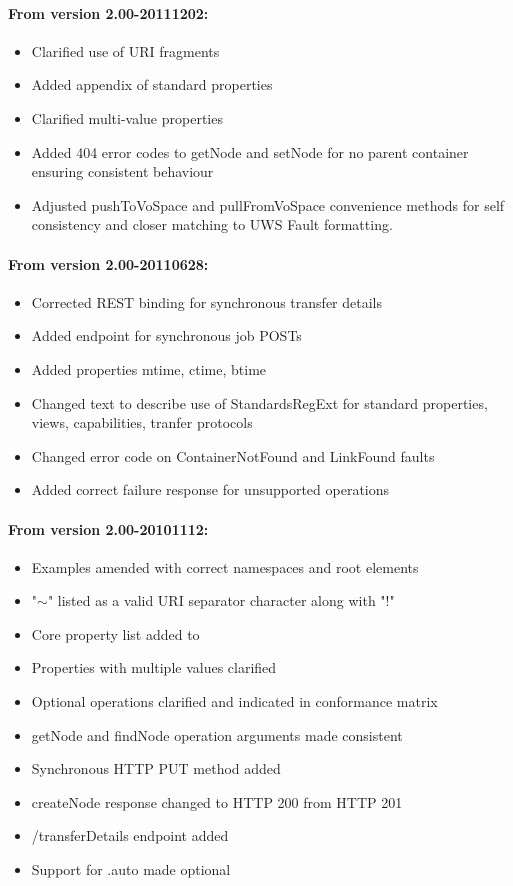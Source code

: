\documentclass[11pt,a4paper]{ivoa}
\begin{document}
\begin{appendices}
\paragraph{From version 2.00-20111202:}
\begin{itemize}
    \item Clarified use of URI fragments
    \item Added appendix of standard properties
    \item Clarified multi-value properties
    \item Added 404 error codes to getNode and setNode for no parent container ensuring consistent behaviour
    \item Adjusted pushToVoSpace and pullFromVoSpace convenience methods for self consistency and closer matching to UWS Fault formatting.
\end{itemize}

\paragraph{From version 2.00-20110628:}
\begin{itemize}
    \item Corrected REST binding for synchronous transfer details
    \item Added endpoint for synchronous job POSTs
    \item Added properties mtime, ctime, btime
    \item Changed text to describe use of StandardsRegExt for standard properties, views, capabilities, tranfer protocols
    \item Changed error code on ContainerNotFound and LinkFound faults
    \item Added correct failure response for unsupported operations
\end{itemize}

\paragraph{From version 2.00-20101112:}
\begin{itemize}
    \item Examples amended with correct namespaces and root elements
    \item "$\mathtt{\sim}$" listed as a valid URI separator character along with "!"
    \item Core property list added to
    \item Properties with multiple values clarified
    \item Optional operations clarified and indicated in conformance matrix
    \item getNode and findNode operation arguments made consistent
    \item Synchronous HTTP PUT method added
    \item createNode response changed to HTTP 200 from HTTP 201
    \item /{transferDetails} endpoint added
    \item Support for .auto made optional
\end{itemize}


\end{appendices}
\end{document}
